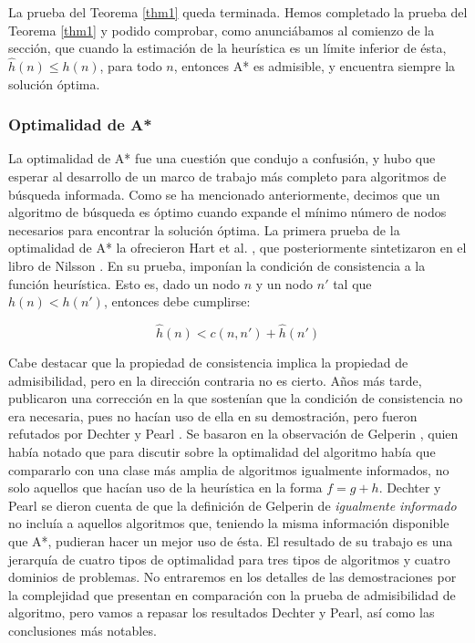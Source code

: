 \documentclass[a4paper,12pt]{article}
\begin{document}
La prueba del Teorema \ref{thm1} queda terminada. Hemos completado la prueba del Teorema \ref{thm1} y podido comprobar, como anunciábamos al comienzo de la sección, que cuando la estimación de la heurística es un límite inferior de ésta, $\hat{h}(n) \leq h(n)$, para todo $n$, entonces A* es admisible, y encuentra siempre la solución óptima.

\subsubsection{Optimalidad de A*}\label{sec:optimalidad}

La optimalidad de A* fue una cuestión que condujo a confusión, y hubo que esperar al desarrollo de un marco de trabajo más completo para algoritmos de búsqueda informada. Como se ha mencionado anteriormente, decimos que un algoritmo de búsqueda es óptimo cuando expande el mínimo número de nodos necesarios para encontrar la solución óptima. La primera prueba de la optimalidad de A* la ofrecieron Hart et al. \cite{hart_formal_1968}, que posteriormente sintetizaron en el libro de Nilsson \cite{nillsson1971problem}. En su prueba, imponían la condición de consistencia a la función heurística. Esto es, dado un nodo $n$ y un nodo $n'$ tal que $h(n) < h(n')$, entonces debe cumplirse:

\begin{equation}
\hat{h}(n) < c(n,n') + \hat{h}(n')
\end{equation}

\noindent Cabe destacar que la propiedad de consistencia implica la propiedad de admisibilidad, pero en la dirección contraria no es cierto. Años más tarde, publicaron una corrección \cite{hart_correction_1972} en la que sostenían que la condición de consistencia no era necesaria, pues no hacían uso de ella en su demostración, pero fueron refutados por Dechter y Pearl \cite{dechter1985generalized, dechter1983optimality}. Se basaron en la observación de Gelperin \cite{gelperin1977optimality}, quien había notado que para discutir sobre la optimalidad del algoritmo había que compararlo con una clase más amplia de algoritmos igualmente informados, no solo aquellos que hacían uso de la heurística en la forma $f = g + h$. Dechter y Pearl se dieron cuenta de que la definición de Gelperin de \textit{igualmente informado} no incluía a aquellos algoritmos que, teniendo la misma información disponible que A*, pudieran hacer un mejor uso de ésta. El resultado de su trabajo es una jerarquía de cuatro tipos de optimalidad para tres tipos de algoritmos y cuatro dominios de problemas. No entraremos en los detalles de las demostraciones por la complejidad que presentan en comparación con la prueba de admisibilidad de algoritmo, pero vamos a repasar los resultados Dechter y Pearl, así como las conclusiones más notables.
\end{document}
